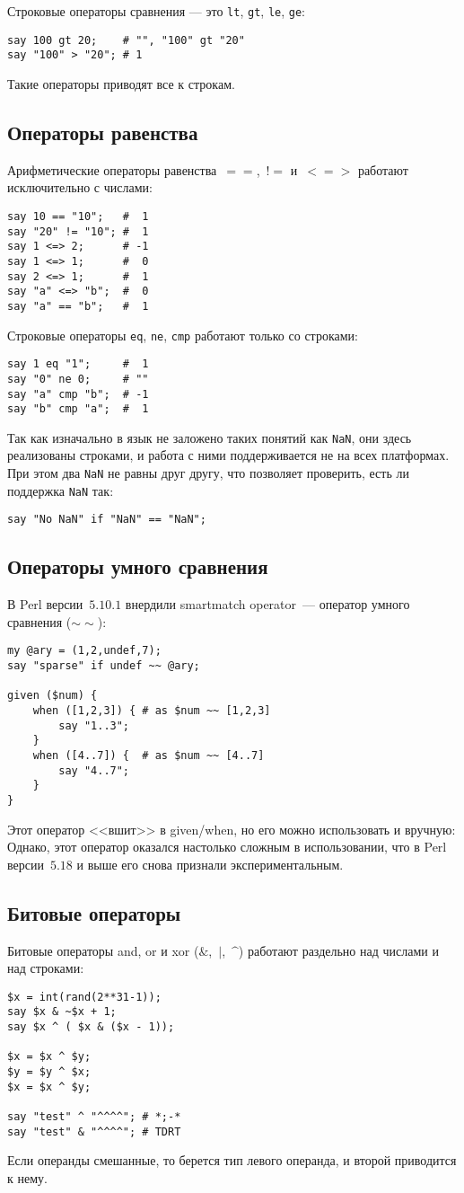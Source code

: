 Строковые операторы сравнения --- это \verb|lt|, \verb|gt|, \verb|le|, \verb|ge|:
\begin{verbatim}
say 100 gt 20;    # "", "100" gt "20"
say "100" > "20"; # 1
\end{verbatim}
Такие операторы приводят все к строкам.

\subsection{Операторы равенства}
Арифметические операторы равенства~$==$,~$!=$ и~$<=>$ работают исключительно с числами:
\begin{verbatim}
say 10 == "10";   #  1
say "20" != "10"; #  1
say 1 <=> 2;      # -1
say 1 <=> 1;      #  0
say 2 <=> 1;      #  1
say "a" <=> "b";  #  0
say "a" == "b";   #  1
\end{verbatim}

Строковые операторы \verb|eq|, \verb|ne|, \verb|cmp| работают только со строками:
\begin{verbatim}
say 1 eq "1";     #  1
say "0" ne 0;     # ""
say "a" cmp "b";  # -1
say "b" cmp "a";  #  1
\end{verbatim}
Так как изначально в язык не заложено таких понятий как \verb|NaN|, они здесь реализованы строками, и работа с ними поддерживается не на всех платформах. При этом два \verb|NaN| не равны друг другу, что позволяет проверить, есть ли поддержка \verb|NaN| так:
\begin{verbatim}
say "No NaN" if "NaN" == "NaN";
\end{verbatim}

\subsection{Операторы умного сравнения}
В Perl версии~$5.10.1$ внердили {smartmatch operator}~--- {оператор умного сравнения} ($\sim\sim$):
\begin{verbatim}
my @ary = (1,2,undef,7);
say "sparse" if undef ~~ @ary;

given ($num) {
    when ([1,2,3]) { # as $num ~~ [1,2,3]
        say "1..3";
    }
    when ([4..7]) {  # as $num ~~ [4..7]
        say "4..7";
    }
}
\end{verbatim}
Этот оператор <<вшит>> в {given/when}, но его можно использовать и вручную:
Однако, этот оператор оказался настолько сложным в использовании, что в Perl версии~$5.18$ и выше его снова признали экспериментальным.

\subsection{Битовые операторы}
{Битовые операторы} {and}, {or} и {xor} ($\&$,~$|$,~$\^$) работают раздельно над числами и над строками:
\begin{verbatim}
$x = int(rand(2**31-1));
say $x & ~$x + 1;
say $x ^ ( $x & ($x - 1));

$x = $x ^ $y;
$y = $y ^ $x;
$x = $x ^ $y;

say "test" ^ "^^^^"; # *;-*
say "test" & "^^^^"; # TDRT
\end{verbatim}
Если операнды смешанные, то берется тип левого операнда, и второй приводится к нему.

